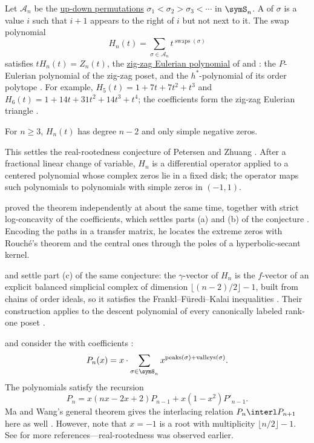 \begin{example*}
\label{zigZagEulerianRealRooted}
Let $\mathcal{A}_n$ be the \hyperref[namedPermutations]{up-down
permutations} $\sigma_1<\sigma_2>\sigma_3<\dotsb$ in $\symS_n$.  A
 of $\sigma$ is a value $i$ such that $i+1$ appears to the right
of $i$ but not next to it.  The swap polynomial
\[
 H_n(t)=\sum_{\sigma\in\mathcal{A}_n}t^{\operatorname{swaps}(\sigma)}
\]
satisfies $tH_n(t)=Z_n(t)$, the
\hyperref[zigZagEulerianGammaPositive]{zig-zag Eulerian polynomial} of
 and : the $P$-Eulerian polynomial
of the zig-zag poset, and the $h^*$-polynomial of its order polytope
\cite{CoonsSullivant2023}.  For example, $H_5(t)=1+7t+7t^2+t^3$ and
$H_6(t)=1+14t+31t^2+14t^3+t^4$; the coefficients form the zig-zag Eulerian
triangle .

\begin{theorem}
For $n\geq3$, $H_n(t)$ has degree $n-2$ and only simple negative zeros.
\end{theorem}

This settles the real-rootedness conjecture of Petersen and Zhuang
\cite[Conj.~6.1(a)]{PetersenZhuang2024x}.  After a fractional linear change
of variable, $H_n$ is a differential operator applied to a centered
polynomial whose complex zeros lie in a fixed disk; the operator maps such
polynomials to polynomials with simple zeros in $(-1,1)$.

 proved the theorem independently at about the same time,
together with strict log-concavity of the coefficients, which settles parts
(a) and (b) of the conjecture \cite[Cor.~1.2]{Torres2026x}.  Encoding the paths in a
transfer matrix, he locates the extreme zeros with Rouché's theorem and the
central ones through the poles of a hyperbolic-secant kernel.

 and  settle part (c) of the same conjecture:
the $\gamma$-vector of $H_n$ is the $f$-vector of an explicit balanced
simplicial complex of dimension $\lfloor (n-2)/2\rfloor-1$, built from chains of
order ideals, so it satisfies the Frankl--F\"uredi--Kalai inequalities
\cite[Thm.~1.2]{ShiWang2026x}.  Their construction applies to the descent
polynomial of every canonically labeled rank-one poset
\cite[Thm.~1.1]{ShiWang2026x}.
\end{example*}


\begin{example*}
 and  consider the
\label{alternatingRunPolynomial}
with coefficients :
\[
  P_n(x) = x \cdot \sum_{\sigma \in \symS_n} x^{\text{peaks}(\sigma)+\text{valleys}(\sigma)}.
\]
The polynomials satisfy the recursion
\[
P_n = x(nx-2x+2)P_{n-1} + x(1-x^2) P'_{n-1}.
\]
Ma and Wang's general theorem gives the
interlacing relation $P_n \interl P_{n+1}$ here as well
\cite{MaWang2008}.  However, note that $x=-1$ is a root with multiplicity
$\lfloor n/2 \rfloor -1$.  See \cite{MaWang2008} for more
references---real-rootedness was observed earlier.
\end{example*}

